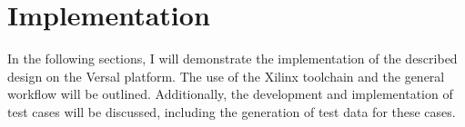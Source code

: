 \chapter{Implementation}\label{ch:implementation}

In the following sections, I will demonstrate the implementation of the described design on the Versal platform. The use of the Xilinx toolchain and the general workflow will be outlined. Additionally, the development and implementation of test cases will be discussed, including the generation of test data for these cases.

